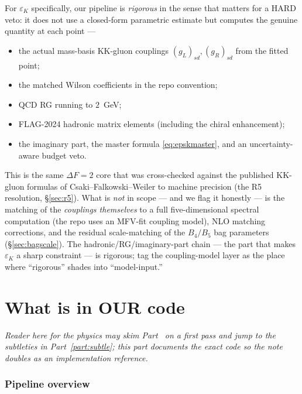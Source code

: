\documentclass[11pt]{article}
\newcommand{\epsK}{\varepsilon_K}
\theoremstyle{definition}
\begin{document}
For $\epsK$ specifically, our pipeline is \emph{rigorous} in the sense that
matters for a HARD veto: it does not use a closed-form parametric estimate but
computes the genuine quantity at each point ---
\begin{itemize}[leftmargin=1.4em]
\item the actual mass-basis KK-gluon couplings $(g_L)_{sd},(g_R)_{sd}$ from the
fitted point;
\item the matched Wilson coefficients in the repo convention;
\item QCD RG running to $2$~GeV;
\item FLAG-2024 hadronic matrix elements (including the chiral enhancement);
\item the imaginary part, the master formula \eqref{eq:epskmaster}, and an
uncertainty-aware budget veto.
\end{itemize}
This is the same $\Delta F=2$ core that was cross-checked against the published
KK-gluon formulas of Csaki--Falkowski--Weiler to machine precision (the R5
resolution, \S\ref{sec:r5}). What is \emph{not} in scope --- and we flag it
honestly --- is the matching of the \emph{couplings themselves} to a full
five-dimensional spectral computation (the repo uses an MFV-fit coupling model),
NLO matching corrections, and the residual scale-matching of the $B_4/B_5$ bag
parameters (\S\ref{sec:bagscale}). The hadronic/RG/imaginary-part chain --- the
part that makes $\epsK$ a sharp constraint --- is rigorous; tag the
coupling-model layer as the place where ``rigorous'' shades into ``model-input.''

\part{What is in OUR code}
\label{part:code}

\emph{Reader here for the physics may skim Part~\ref{part:code} on a first pass
and jump to the subtleties in Part~\ref{part:subtle}; this part documents the
exact code so the note doubles as an implementation reference.}

\section{Pipeline overview}
\label{sec:pipeline}
\end{document}
